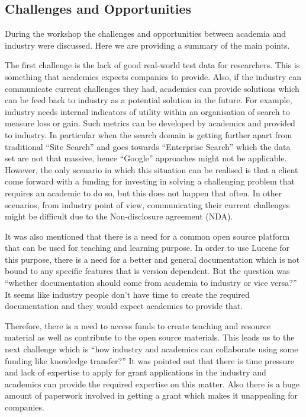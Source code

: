 \subsection{Challenges and Opportunities}


During the workshop the challenges and opportunities between academia and industry were discussed. 
Here we are providing a summary of the main points.

The first challenge is the lack of good real-world test data for researchers. This is something that academics expects companies to provide. 
Also, if the industry can communicate current challenges they had, academics can provide solutions which can be feed back to industry as a potential solution in the future. 
For example, industry needs internal indicators of utility within an organisation of search to measure loss or gain. 
Such metrics can be developed by academics and provided to industry. 
In particular when the search domain is getting further apart from traditional ``Site Search'' and goes towards ``Enterprise Search'' which the data set are not that massive, hence ``Google'' approaches might not be applicable. 
However, the only scenario in which this situation can be realised is that a client come forward with a funding for investing in solving a challenging problem that requires an academic to do so, but this does not happen that often. 
In other scenarios, from industry point of view, communicating their current challenges might be difficult due to the Non-disclosure agreement (NDA).

It was also mentioned that there is a need for a common open source platform that can be used for teaching and learning purpose. 
In order to use Lucene for this purpose, there is a need for a better and general documentation which is not bound to any specific features that is version dependent. 
But the question was ``whether documentation should come from academia to industry or vice versa?''
It seems like industry people don't have time to create the required documentation and they would expect academics to provide that. 

Therefore, there is a need to access funds to create teaching and resource material as well as contribute to the open source materials. 
This leads us to the next challenge which is ``how industry and academics can collaborate using some funding like knowledge transfer?''
It was pointed out that there is time pressure and lack of expertise to apply for grant applications in the industry and academics can provide the required expertise on this matter. 
Also there is a huge amount of paperwork involved in getting a grant which makes it unappealing for companies. 


